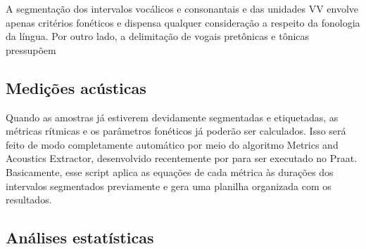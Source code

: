 \documentclass[
			a4paper,		%
			12pt,			%
			oneside,
			]{article}		%
\begin{document}
A segmentação dos intervalos vocálicos e consonantais e das unidades VV envolve apenas 
critérios fonéticos e dispensa qualquer consideração a respeito da fonologia da língua. 
Por outro lado, a delimitação de vogais pretônicas e tônicas pressupõem 

	\subsection{Medições acústicas}
	
Quando as amostras já estiverem devidamente segmentadas e etiquetadas, as métricas 
rítmicas e os parâmetros fonéticos já poderão ser calculados. Isso será feito de modo 
completamente automático por meio do algoritmo Metrics and Acoustics Extractor, 
desenvolvido recentemente por \citet{Junior.Barbosa2019} para ser executado no Praat. 
Basicamente, esse script aplica as equações de cada métrica às durações dos intervalos 
segmentados previamente e gera uma planilha organizada com os resultados.

	\subsection{Análises estatísticas}


{ %
	\printbibliography
}
\end{document}
